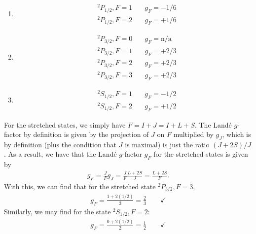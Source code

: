 \documentclass{article}
\theoremstyle{definition}
\newcommand{\f}[2]{\frac{#1}{#2}}
\begin{document}
\begin{enumerate}[label=(\alph*)]
	\item
	\begin{align*}
	&^2P_{1/2}, F=1 \quad& g_F = -1/6\\
	&^2P_{1/2}, F=2 \quad& g_F = +1/6
	\end{align*}
	
	\item 
	\begin{align*}
	&^2P_{3/2}, F=0 \quad& g_F = \text{n/a}\\
	&^2P_{3/2}, F=1 \quad& g_F = +2/3\\
	&^2P_{3/2}, F=2 \quad& g_F = +2/3\\
	&^2P_{3/2}, F=3 \quad& g_F = +2/3
	\end{align*}
	
	\item 
	\begin{align*}
	&^2S_{1/2}, F=1 \quad& g_F = -1/2\\
	&^2S_{1/2}, F=2 \quad& g_F = +1/2
	\end{align*}
	
	
	
\end{enumerate}




For the stretched states, we simply have $F= I+J = I+ L +S$. The Land\'{e} $g$-factor by definition is given by the projection of $J$ on $F$ multiplied by $g_J$, which is by definition (plus the condition that $J$ is maximal) is just the ratio $(J+2S)/J$. As a result, we have that the Land\'{e} $g$-factor $g_F$ for the stretched states is given by 
\begin{align*}
g_F = \f{J}{F}g_J = \f{J}{F} \f{L+2S}{J} = \f{L+2S}{F}.
\end{align*}
With this, we can find that for the stretched state $^2P_{3/2}, F=3$, 
\begin{align*}
g_F= \f{1+2(1/2)}{3} = \f{2}{3} \quad\quad \checkmark
\end{align*}
Similarly, we may find for the state $^2S_{1/2}, F=2$:
\begin{align*}
g_F = \f{0+2(1/2)}{2} =\f{1}{2} \quad\quad\checkmark
\end{align*}
\end{document}
